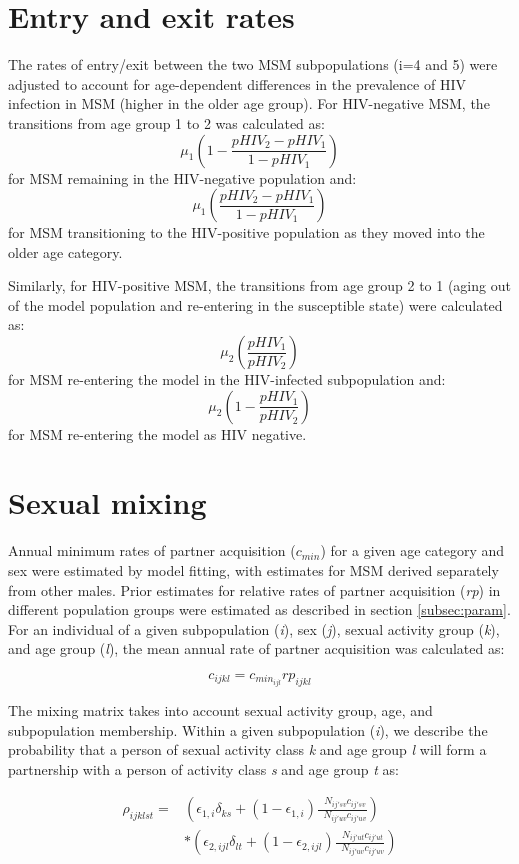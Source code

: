 \documentclass[a4paper]{article}
\begin{document}
\section{Entry and exit rates}
The rates of entry/exit between the two MSM subpopulations (i=4 and 5) were adjusted to account for age-dependent differences in the prevalence of HIV infection in MSM (higher in the older age group). For HIV-negative MSM, the transitions from age group 1 to 2 was calculated as:
\[\mu_1  \left( 1 - \frac{pHIV_2 - pHIV_1}{1-pHIV_1}\right)\] for MSM remaining in the HIV-negative population and: 
\[\mu_1 \left( \frac{pHIV_2 - pHIV_1}{1-pHIV_1} \right)\] for MSM transitioning to the HIV-positive population as they moved into the older age category.

Similarly, for HIV-positive MSM, the transitions from age group 2 to 1 (aging out of the model population and re-entering in the susceptible state) were calculated as: 
\[\mu_2  \left( \frac{pHIV_1}{pHIV_2}\right)\] for MSM re-entering the model in the HIV-infected subpopulation and:
\[\mu_2  \left( 1 - \frac{pHIV_1}{pHIV_2}\right)\] for MSM re-entering the model as HIV negative.    

\section{Sexual mixing}
\label{sec:mixing}

Annual minimum rates of partner acquisition ($c_{min}$) for a given age category and sex were estimated by model fitting, with estimates for MSM derived separately from other males. Prior estimates for relative rates of partner acquisition (\textit{rp}) in different population groups were estimated as described in section \ref{subsec:param}. For an individual of a given subpopulation (\textit{i}), sex (\textit{j}), sexual activity group (\textit{k}), and age group (\textit{l}), the mean annual rate of partner acquisition was calculated as:

\[c_{ijkl} = c_{min_{ijl}}rp_{ijkl}\]

The mixing matrix takes into account sexual activity group, age, and subpopulation membership. Within a given subpopulation (\textit{i}), we describe the probability that a person of sexual activity class \textit{k} and age group \textit{l} will form a partnership with a person of activity class \textit{s} and age group \textit{t} as:

\begin{equation*}\label{mixing}
\begin{aligned}
\rho_{ijklst}={} & (\epsilon_{1,i} \delta_{ks} + 
(1-\epsilon_{1,i})\frac{{\mathop{\sum\limits_{v=1}^2}} N_{ij'sv}c_{ij'sv}}{{\mathop{\sum\limits_{u=1}^2 \sum\limits_{v=1}^2}} N_{ij'uv} c_{ij'uv}})\\ & *(\epsilon_{2,ijl} \delta_{lt} + 
(1-\epsilon_{2,ijl})\frac{{\mathop{\sum\limits_{u=1}^2}} N_{ij'ut}c_{ij'ut}}{{\mathop{\sum\limits_{u=1}^2 \sum\limits_{v=1}^2}} N_{ij'uv} c_{ij'uv}})
\end{aligned}
\end{equation*}
\end{document}
